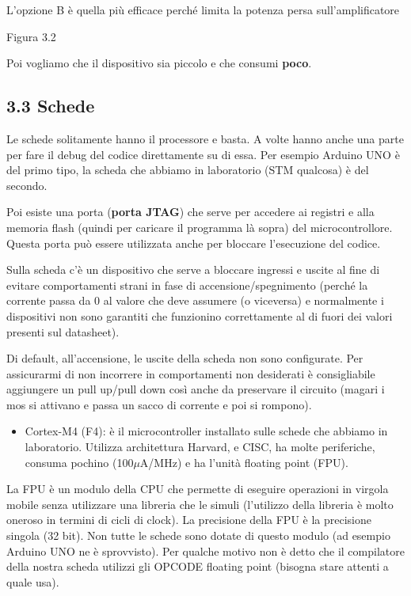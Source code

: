 \documentclass[
]{article}
\providecommand{\tightlist}{%
  \setlength{\itemsep}{0pt}\setlength{\parskip}{0pt}}
\begin{document}
L'opzione B è quella più efficace perché limita la potenza persa
sull'amplificatore

Figura 3.2

Poi vogliamo che il dispositivo sia piccolo e che consumi \textbf{poco}.

\subsection{3.3 Schede}\label{schede}

Le schede solitamente hanno il processore e basta. A volte hanno anche
una parte per fare il debug del codice direttamente su di essa. Per
esempio Arduino UNO è del primo tipo, la scheda che abbiamo in
laboratorio (STM qualcosa) è del secondo.

Poi esiste una porta (\textbf{porta JTAG}) che serve per accedere ai
registri e alla memoria flash (quindi per caricare il programma là
sopra) del microcontrollore. Questa porta può essere utilizzata anche
per bloccare l'esecuzione del codice.

Sulla scheda c'è un dispositivo che serve a bloccare ingressi e uscite
al fine di evitare comportamenti strani in fase di
accensione/spegnimento (perché la corrente passa da 0 al valore che deve
assumere (o viceversa) e normalmente i dispositivi non sono garantiti
che funzionino correttamente al di fuori dei valori presenti sul
datasheet).

Di default, all'accensione, le uscite della scheda non sono configurate.
Per assicurarmi di non incorrere in comportamenti non desiderati è
consigliabile aggiungere un pull up/pull down così anche da preservare
il circuito (magari i mos si attivano e passa un sacco di corrente e poi
si rompono).

\begin{itemize}
\tightlist
\item
  Cortex-M4 (F4): è il microcontroller installato sulle schede che
  abbiamo in laboratorio. Utilizza architettura Harvard, e CISC, ha
  molte periferiche, consuma pochino (100\(\mu\)A/MHz) e ha l'unità
  floating point (FPU).
\end{itemize}

La FPU è un modulo della CPU che permette di eseguire operazioni in
virgola mobile senza utilizzare una libreria che le simuli (l'utilizzo
della libreria è molto oneroso in termini di cicli di clock). La
precisione della FPU è la precisione singola (32 bit). Non tutte le
schede sono dotate di questo modulo (ad esempio Arduino UNO ne è
sprovvisto). Per qualche motivo non è detto che il compilatore della
nostra scheda utilizzi gli OPCODE floating point (bisogna stare attenti
a quale usa).
\end{document}
